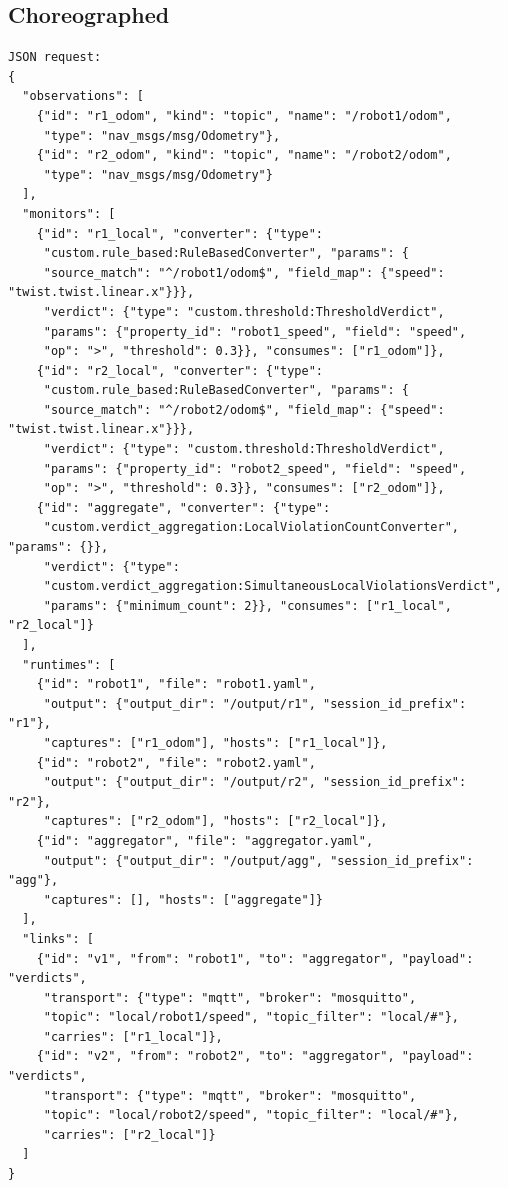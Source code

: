\documentclass[11pt]{article}
\begin{document}
\subsection{Choreographed}

\begin{verbatim}
JSON request:
{
  "observations": [
    {"id": "r1_odom", "kind": "topic", "name": "/robot1/odom",
     "type": "nav_msgs/msg/Odometry"},
    {"id": "r2_odom", "kind": "topic", "name": "/robot2/odom",
     "type": "nav_msgs/msg/Odometry"}
  ],
  "monitors": [
    {"id": "r1_local", "converter": {"type":
     "custom.rule_based:RuleBasedConverter", "params": {
     "source_match": "^/robot1/odom$", "field_map": {"speed": "twist.twist.linear.x"}}},
     "verdict": {"type": "custom.threshold:ThresholdVerdict",
     "params": {"property_id": "robot1_speed", "field": "speed",
     "op": ">", "threshold": 0.3}}, "consumes": ["r1_odom"]},
    {"id": "r2_local", "converter": {"type":
     "custom.rule_based:RuleBasedConverter", "params": {
     "source_match": "^/robot2/odom$", "field_map": {"speed": "twist.twist.linear.x"}}},
     "verdict": {"type": "custom.threshold:ThresholdVerdict",
     "params": {"property_id": "robot2_speed", "field": "speed",
     "op": ">", "threshold": 0.3}}, "consumes": ["r2_odom"]},
    {"id": "aggregate", "converter": {"type":
     "custom.verdict_aggregation:LocalViolationCountConverter", "params": {}},
     "verdict": {"type":
     "custom.verdict_aggregation:SimultaneousLocalViolationsVerdict",
     "params": {"minimum_count": 2}}, "consumes": ["r1_local", "r2_local"]}
  ],
  "runtimes": [
    {"id": "robot1", "file": "robot1.yaml",
     "output": {"output_dir": "/output/r1", "session_id_prefix": "r1"},
     "captures": ["r1_odom"], "hosts": ["r1_local"]},
    {"id": "robot2", "file": "robot2.yaml",
     "output": {"output_dir": "/output/r2", "session_id_prefix": "r2"},
     "captures": ["r2_odom"], "hosts": ["r2_local"]},
    {"id": "aggregator", "file": "aggregator.yaml",
     "output": {"output_dir": "/output/agg", "session_id_prefix": "agg"},
     "captures": [], "hosts": ["aggregate"]}
  ],
  "links": [
    {"id": "v1", "from": "robot1", "to": "aggregator", "payload": "verdicts",
     "transport": {"type": "mqtt", "broker": "mosquitto",
     "topic": "local/robot1/speed", "topic_filter": "local/#"},
     "carries": ["r1_local"]},
    {"id": "v2", "from": "robot2", "to": "aggregator", "payload": "verdicts",
     "transport": {"type": "mqtt", "broker": "mosquitto",
     "topic": "local/robot2/speed", "topic_filter": "local/#"},
     "carries": ["r2_local"]}
  ]
}


\end{verbatim}
\end{document}

